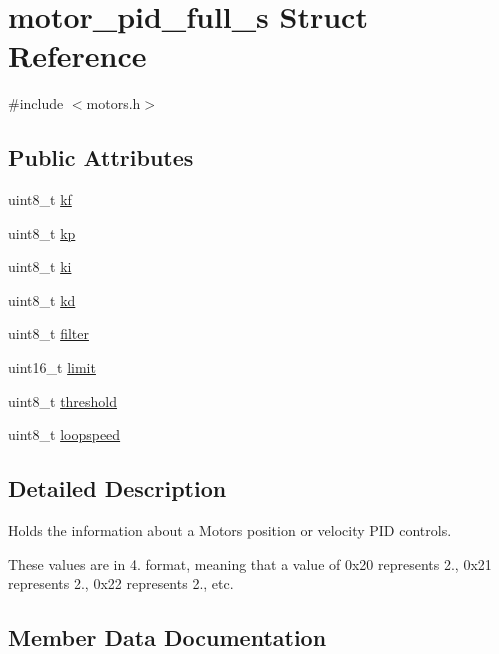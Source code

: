 \hypertarget{structmotor__pid__full__s}{}\section{motor\+\_\+pid\+\_\+full\+\_\+s Struct Reference}
\label{structmotor__pid__full__s}


{\ttfamily \#include $<$motors.\+h$>$}

\subsection*{Public Attributes}
\begin{DoxyCompactItemize}
\item 
uint8\+\_\+t \hyperlink{structmotor__pid__full__s_aca37978c9743342bf520dcadf2eed67c}{kf}
\item 
uint8\+\_\+t \hyperlink{structmotor__pid__full__s_a5c90af94c336d26a8ecdd4b88f06c9d9}{kp}
\item 
uint8\+\_\+t \hyperlink{structmotor__pid__full__s_ad6800234728012e59dc6c945cc6465d5}{ki}
\item 
uint8\+\_\+t \hyperlink{structmotor__pid__full__s_a02e542bcec0f870af870cd37a4e2a922}{kd}
\item 
uint8\+\_\+t \hyperlink{structmotor__pid__full__s_af6f15fc8e1a49098f69aba255a3b21c6}{filter}
\item 
uint16\+\_\+t \hyperlink{structmotor__pid__full__s_a98141ce9bce70a500cf18c7a92d866c5}{limit}
\item 
uint8\+\_\+t \hyperlink{structmotor__pid__full__s_a50b463b6ffd906bfef9ae1edc7cc872e}{threshold}
\item 
uint8\+\_\+t \hyperlink{structmotor__pid__full__s_a567385b82081690c526a618b2110e030}{loopspeed}
\end{DoxyCompactItemize}


\subsection{Detailed Description}
Holds the information about a Motor\textquotesingle{}s position or velocity P\+ID controls.

These values are in 4. format, meaning that a value of 0x20 represents 2., 0x21 represents 2., 0x22 represents 2., etc. 

\subsection{Member Data Documentation}
\mbox{\label{structmotor__pid__full__s_af6f15fc8e1a49098f69aba255a3b21c6}} 

